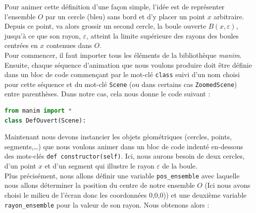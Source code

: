 \documentclass[12pt,a4paper,twoside]{article}
\numberwithin{equation}{section}
\begin{document}
Pour animer cette définition d'une façon simple, l'idée est de représenter
l'ensemble $O$ par un cercle (bleu) sans bord et d'y placer un point $x$
arbitraire. Depuis ce point, va alors grossir un second cercle, la boule ouverte
$B(x, \varepsilon)$, jusqu'à ce que son rayon, $\varepsilon$, atteint la limite
supérieure des rayons des boules centrées en $x$ contenues dans $O$.\\

Pour commencer, il faut importer tous les éléments de la bibliothèque
\textit{manim}. Ensuite, chaque séquence d'animation que nous voulons produire
doit être définie dans un bloc de code commençant par le mot-clé \verb+class+
suivi d'un nom choisi pour cette séquence et du mot-clé \verb+Scene+ (ou dans
certains cas \verb+ZoomedScene+) entre parenthèses. Dans notre cas, cela nous
donne le code suivant :\\

\begin{lstlisting}[language=Python]
from manim import *
class DefOuvert(Scene):
\end{lstlisting}

Maintenant nous devons instancier les objets géométriques (cercles, points, segments,\ldots) que nous voulons animer dans un bloc de code indenté en-dessous des mots-clés \verb+def constructor(self)+. Ici, nous aurons besoin de deux cercles, d'un point $x$ et d'un segment qui illustre le rayon $\varepsilon$ de la boule.\\

Plus précisément, nous allons définir une variable \verb|pos_ensemble| avec laquelle nous allons déterminer la position du centre de notre ensemble $O$ (Ici nous avons choisi le milieu de l'écran donc les coordonnées 0,0,0)) et une deuxième variable \verb|rayon_ensemble| pour la valeur de son rayon.
Nous obtenons alors :\\
\end{document}
